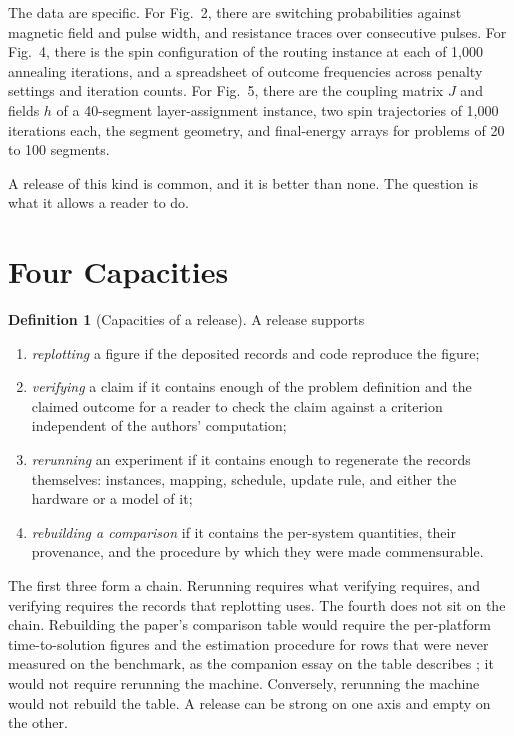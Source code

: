 \documentclass[11pt]{article}
\theoremstyle{definition}
\newtheorem{definition}{Definition}
\theoremstyle{remark}
\begin{document}
The data are specific. For Fig.~2, there are switching probabilities against magnetic field and pulse width, and resistance traces over consecutive pulses. For Fig.~4, there is the spin configuration of the routing instance at each of 1,000 annealing iterations, and a spreadsheet of outcome frequencies across penalty settings and iteration counts. For Fig.~5, there are the coupling matrix $J$ and fields $h$ of a 40-segment layer-assignment instance, two spin trajectories of 1,000 iterations each, the segment geometry, and final-energy arrays for problems of 20 to 100 segments.

A release of this kind is common, and it is better than none. The question is what it allows a reader to do.

\section{Four Capacities}

\begin{definition}[Capacities of a release]
A release supports
\begin{enumerate}
\item \emph{replotting} a figure if the deposited records and code reproduce the figure;
\item \emph{verifying} a claim if it contains enough of the problem definition and the claimed outcome for a reader to check the claim against a criterion independent of the authors' computation;
\item \emph{rerunning} an experiment if it contains enough to regenerate the records themselves: instances, mapping, schedule, update rule, and either the hardware or a model of it;
\item \emph{rebuilding a comparison} if it contains the per-system quantities, their provenance, and the procedure by which they were made commensurable.
\end{enumerate}
\end{definition}

The first three form a chain. Rerunning requires what verifying requires, and verifying requires the records that replotting uses. The fourth does not sit on the chain. Rebuilding the paper's comparison table would require the per-platform time-to-solution figures and the estimation procedure for rows that were never measured on the benchmark, as the companion essay on the table describes \cite{flyxion-table}; it would not require rerunning the machine. Conversely, rerunning the machine would not rebuild the table. A release can be strong on one axis and empty on the other.
\end{document}
